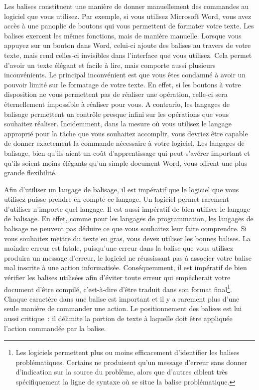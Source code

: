 \documentclass[
  letterpaper,
]{scrbook}
\begin{document}
Les balises constituent une manière de donner manuellement des commandes
au logiciel que vous utilisez. Par exemple, si vous utilisez Microsoft
Word, vous avez accès à une panoplie de boutons qui vous permettent de
formater votre texte. Les balises exercent les mêmes fonctions, mais de
manière manuelle. Lorsque vous appuyez sur un bouton dans Word, celui-ci
ajoute des balises au travers de votre texte, mais rend celles-ci
invisibles dans l'interface que vous utilisez. Cela permet d'avoir un
texte élégant et facile à lire, mais comporte aussi plusieurs
inconvénients. Le principal inconvénient est que vous êtes condamné à
avoir un pouvoir limité sur le formatage de votre texte. En effet, si
les boutons à votre disposition ne vous permettent pas de réaliser une
opération, celle-ci sera éternellement impossible à réaliser pour vous.
A contrario, les langages de balisage permettent un contrôle presque
infini sur les opérations que vous souhaitez réaliser. Incidemment, dans
la mesure où vous utilisez le langage approprié pour la tâche que vous
souhaitez accomplir, vous devriez être capable de donner exactement la
commande nécessaire à votre logiciel. Les langages de balisage, bien
qu'ils aient un coût d'apprentissage qui peut s'avérer important et
qu'ils soient moins élégants qu'un simple document Word, vous offrent
une plus grande flexibilité.

Afin d'utiliser un langage de balisage, il est impératif que le logiciel
que vous utilisez puisse prendre en compte ce langage. Un logiciel
permet rarement d'utiliser n'importe quel langage. Il est aussi
impératif de bien utiliser le langage de balisage. En effet, comme pour
les langages de programmation, les langages de balisage ne peuvent pas
déduire ce que vous souhaitez leur faire comprendre. Si vous souhaitez
mettre du texte en gras, vous devez utiliser les bonnes balises. La
moindre erreur est fatale, puisqu'une erreur dans la balise que vous
utilisez produira un message d'erreur, le logiciel ne réussissant pas à
associer votre balise mal inscrite à une action informatisée.
Conséquemment, il est impératif de bien vérifier les balises utilisées
afin d'éviter toute erreur qui empêcherait votre document d'être
compilé, c'est-à-dire d'être traduit dans son format final\footnote{Les
  logiciels permettent plus ou moins efficacement d'identifier les
  balises problématiques. Certains ne produisent qu'un message d'erreur
  sans donner d'indication sur la source du problème, alors que d'autres
  ciblent très spécifiquement la ligne de syntaxe où se situe la balise
  problématique.}. Chaque caractère dans une balise est important et il
y a rarement plus d'une seule manière de commander une action. Le
positionnement des balises est lui aussi critique~: il délimite la
portion de texte à laquelle doit être appliquée l'action commandée par
la balise.
\end{document}
